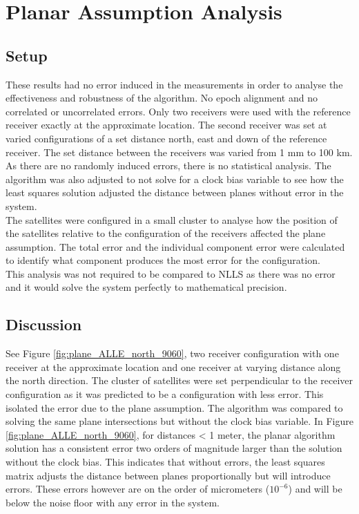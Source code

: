 
\section{Planar Assumption Analysis}
\subsection{Setup}
These results had no error induced in the measurements in order to analyse the effectiveness and robustness of the algorithm. No epoch alignment and no correlated or uncorrelated errors. Only two receivers were used with the reference receiver exactly at the approximate location. The second receiver was set at varied configurations of a set distance north, east and down of the reference receiver. The set distance between the receivers was varied from 1 mm to 100 km. As there are no randomly induced errors, there is no statistical analysis. The algorithm was also adjusted to not solve for a clock bias variable to see how the least squares solution adjusted the distance between planes without error in the system.\\

The satellites were configured in a small cluster to analyse how the position of the satellites relative to the configuration of the receivers affected the plane assumption. The total error and the individual component error were calculated to identify what component produces the most error for the configuration.\\

This analysis was not required to be compared to NLLS as there was no error and it would solve the system perfectly to mathematical precision.

\subsection{Discussion}
See Figure \ref{fig:plane_ALLE_north_9060}, two receiver configuration with one receiver at the approximate location and one receiver at varying distance along the north direction. The cluster of satellites were set perpendicular to the receiver configuration as it was predicted to be a configuration with less error. This isolated the error due to the plane assumption. The algorithm was compared to solving the same plane intersections but without the clock bias variable. In Figure \ref{fig:plane_ALLE_north_9060}, for distances < 1 meter, the planar algorithm solution has a consistent error two orders of magnitude larger than the solution without the clock bias. This indicates that without errors, the least squares matrix adjusts the distance between planes proportionally but will introduce errors. These errors however are on the order of micrometers ($10^{-6}$) and will be below the noise floor with any error in the system.\\

